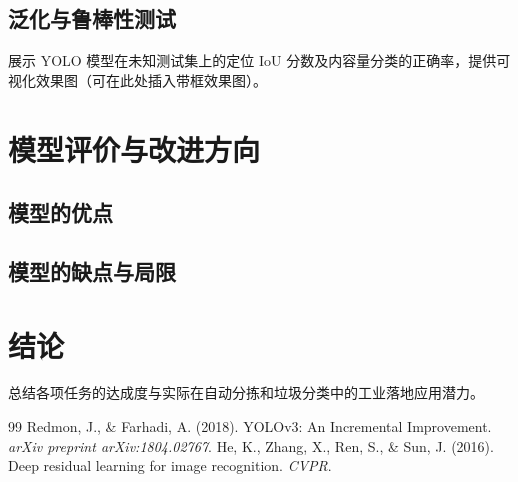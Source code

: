 \documentclass[12pt,a4paper,UTF8]{ctexart}
\begin{document}
\subsection{泛化与鲁棒性测试}
展示 YOLO 模型在未知测试集上的定位 IoU 分数及内容量分类的正确率，提供可视化效果图（可在此处插入带框效果图）。

\section{模型评价与改进方向}
\subsection{模型的优点}
\subsection{模型的缺点与局限}

\section{结论}
总结各项任务的达成度与实际在自动分拣和垃圾分类中的工业落地应用潜力。

\begin{thebibliography}{99}
 Redmon, J., \& Farhadi, A. (2018). YOLOv3: An Incremental Improvement. \textit{arXiv preprint arXiv:1804.02767}.
 He, K., Zhang, X., Ren, S., \& Sun, J. (2016). Deep residual learning for image recognition. \textit{CVPR}.
\end{thebibliography}
\end{document}
